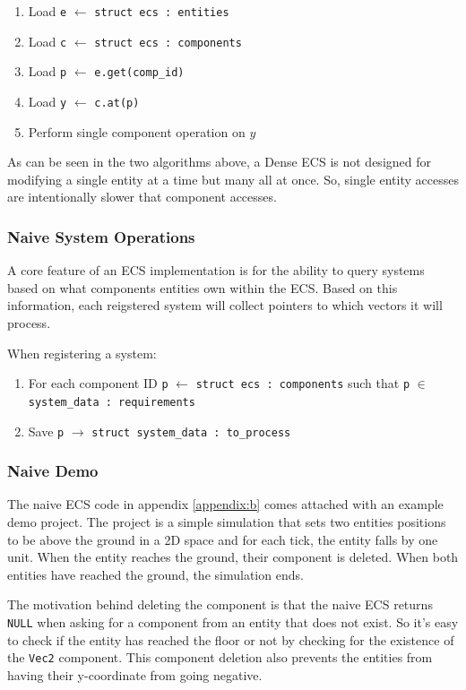 \begin{enumerate}
    \item Load \texttt{e} $\leftarrow$ \texttt{struct ecs : entities}
    \item Load \texttt{c} $\leftarrow$ \texttt{struct ecs : components}
    \item Load \texttt{p} $\leftarrow$ \texttt{e.get(comp\_id)}
    \item Load \texttt{y} $\leftarrow$ \texttt{c.at(p)}
    \item Perform single component operation on $y$
\end{enumerate}

As can be seen in the two algorithms above, a Dense ECS is not designed for modifying a single entity at a time but many all at once. So, single entity accesses are intentionally slower that component accesses. \cite{EnTT_SparseSets}

\subsubsection{Naive System Operations}
A core feature of an ECS implementation is for the ability to query systems based on what components entities own within the ECS. Based on this information, each reigstered system will collect pointers to which vectors it will process.

When registering a system:
\begin{enumerate}
    \item For each component ID \texttt{p} $\leftarrow$ \texttt{struct ecs : components} such that \texttt{p} $\in$ \texttt{system\_data : requirements}
    \item Save \texttt{p} $\rightarrow$ \texttt{struct system\_data : to\_process }
\end{enumerate}

\subsubsection{Naive Demo}
The naive ECS code in appendix \ref{appendix:b} comes attached with an example demo project. The project is a simple simulation that sets two entities positions to be above the ground in a 2D space and for each tick, the entity falls by one unit. When the entity reaches the ground, their component is deleted. When both entities have reached the ground, the simulation ends. 

The motivation behind deleting the component is that the naive ECS returns \texttt{NULL} when asking for a component from an entity that does not exist. So it's easy to check if the entity has reached the floor or not by checking for the existence of the \texttt{Vec2} component. This component deletion also prevents the entities from having their y-coordinate from going negative.

